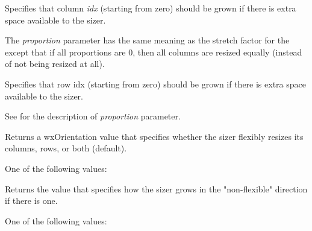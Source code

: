 
Specifies that column {\it idx} (starting from zero) should be grown if
there is extra space available to the sizer.

The {\it proportion} parameter has the same meaning as the stretch factor for
the  except that if all proportions are $0$,
then all columns are resized equally (instead of not being resized at all).

\label{wxflexgridsizeraddgrowablerow}


Specifies that row idx (starting from zero) should be grown if there
is extra space available to the sizer.

See  for the description
of {\it proportion} parameter.

\label{wxflexgridsizergetflexibledrection}


Returns a wxOrientation value that specifies whether the sizer flexibly
resizes its columns, rows, or both (default).


One of the following values:

\begin{twocollist}
\end{twocollist}




\label{wxflexgridsizergetnonflexiblegrowmode}


Returns the value that specifies how the sizer grows in the "non-flexible"
direction if there is one.


One of the following values:

